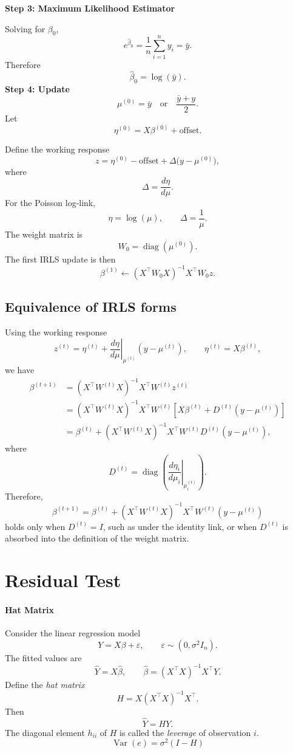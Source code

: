 \documentclass[11pt]{article}
\theoremstyle{definition}
\begin{document}
\textbf{Step 3: Maximum Likelihood Estimator}

Solving for $\beta_0$,
\[
e^{\hat{\beta}_0}
=
\frac{1}{n}\sum_{i=1}^{n} y_i
=
\bar{y}.
\]
Therefore
\[
\hat{\beta}_0
=
\log(\bar{y}).
\]
\textbf{Step 4: Update}
\[
\mu^{(0)} =
\bar y 
\quad \text{or} \quad
\frac{\bar y + y}{2}.
\]
Let
\[
\eta^{(0)} = X\beta^{(0)} + \text{offset}.
\]

Define the working response
\[
z
=
\eta^{(0)} - \text{offset}
+
\Delta\bigl(y-\mu^{(0)}\bigr),
\]
where
\[
\Delta = \frac{d\eta}{d\mu}.
\]
For the Poisson log-link,
\[
\eta = \log(\mu),
\qquad
\Delta = \frac{1}{\mu}.
\]
The weight matrix is
\[
W_0 = \operatorname{diag}(\mu^{(0)}).
\]
The first IRLS update is then
\[
\beta^{(1)}
\leftarrow
\left(X^\top W_0 X\right)^{-1}
X^\top W_0 z .
\]
\subsection{Equivalence of IRLS forms}
Using the working response
\[
z^{(t)}
=
\eta^{(t)}
+
\left.\frac{d\eta}{d\mu}\right|_{\mu^{(t)}}
\left(y-\mu^{(t)}\right),
\qquad
\eta^{(t)}=X\beta^{(t)},
\]
we have
\[
\begin{aligned}
\beta^{(t+1)}
&=
\left(X^\top W^{(t)}X\right)^{-1}
X^\top W^{(t)}z^{(t)}\\
&=
\left(X^\top W^{(t)}X\right)^{-1}
X^\top W^{(t)}
\left[
X\beta^{(t)}
+
D^{(t)}(y-\mu^{(t)})
\right]\\
&=
\beta^{(t)}
+
\left(X^\top W^{(t)}X\right)^{-1}
X^\top W^{(t)}D^{(t)}
(y-\mu^{(t)}),
\end{aligned}
\]
where
\[
D^{(t)}
=
\operatorname{diag}\left(
\left.\frac{d\eta_i}{d\mu_i}\right|_{\mu_i^{(t)}}
\right).
\]
Therefore,
\[
\beta^{(t+1)}
=
\beta^{(t)}
+
\left(X^\top W^{(t)}X\right)^{-1}
X^\top W^{(t)}(y-\mu^{(t)})
\]
holds only when \(D^{(t)}=I\), such as under the identity link, or when
\(D^{(t)}\) is absorbed into the definition of the weight matrix.
\newpage
\section{Residual Test}
\paragraph{Hat Matrix}
Consider the linear regression model
\[
Y = X\beta + \varepsilon, \qquad \varepsilon \sim (0,\sigma^2 I_n).
\]
The fitted values are
\[
\hat{Y} = X\hat{\beta},
\qquad 
\hat{\beta} = (X^\top X)^{-1}X^\top Y .
\]
Define the \emph{hat matrix}
\[
H = X (X^\top X)^{-1} X^\top .
\]
Then
\[
\hat{Y} = HY .
\]
The diagonal element $h_{ii}$ of $H$ is called the \emph{leverage} of observation $i$.
$$
\operatorname{Var}(e)=\sigma^2(I-H)
$$
\end{document}

